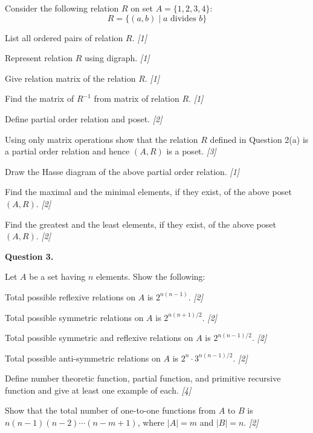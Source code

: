 \documentclass[11pt,a4paper]{article}
\newcommand{\pts}[1]{\hfill   \textit{[#1]}}
\begin{document}
\begin{parts}
  \item Consider the following relation $R$ on set $A = \{1, 2, 3, 4\}$:
  \[ R = \{(a, b) \mid a  \text{ divides } b\} \]
  
\begin{parts}
    \item List all ordered pairs of relation $R$. \pts{1}
    \item Represent relation $R$ using digraph. \pts{1}
    \item Give relation matrix of the relation $R$. \pts{1}
    \item Find the matrix of $R^{-1}$ from matrix of relation $R$. \pts{1}
  \end{parts}
  \item 
  
\begin{parts}
    \item Define partial order relation and poset. \pts{2}
    \item Using only matrix operations show that the relation $R$ defined in Question 2(a) is a partial order relation and hence $(A, R)$ is a poset. \pts{3}
    \item Draw the Hasse diagram of the above partial order relation. \pts{1}
    \item Find the maximal and the minimal elements, if they exist, of the above poset $(A, R)$. \pts{2}
    \item Find the greatest and the least elements, if they exist, of the above poset $(A, R)$. \pts{2}
  \end{parts}
\end{parts}

\medskip


\noindent   \textbf{Question 3.}

\begin{parts}
  \item Let $A$ be a set having $n$ elements. Show the following:
  
\begin{parts}
    \item Total possible reflexive relations on $A$ is $2^{n(n-1)}$. \pts{2}
    \item Total possible symmetric relations on $A$ is $2^{n(n+1)/2}$. \pts{2}
    \item Total possible symmetric and reflexive relations on $A$ is $2^{n(n-1)/2}$. \pts{2}
    \item Total possible anti-symmetric relations on $A$ is $2^n \cdot 3^{n(n-1)/2}$. \pts{2}
  \end{parts}
  \item Define number theoretic function, partial function, and primitive recursive function and give at least one example of each. \pts{4}
  \item Show that the total number of one-to-one functions from $A$ to $B$ is $n(n-1)(n-2)\cdots(n-m+1)$, where $|A| = m$ and $|B| = n$. \pts{2}
\end{parts}
\end{document}
